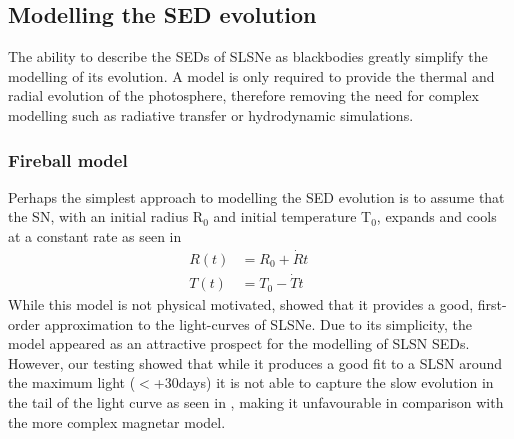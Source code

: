 \subsection{Modelling the SED evolution}
The ability to describe the SEDs of SLSNe as blackbodies greatly simplify the
modelling of its evolution. A model is only required to provide the thermal and radial evolution of the photosphere, therefore removing the need for complex modelling such as radiative transfer or hydrodynamic simulations.

\subsubsection{Fireball model}
Perhaps the simplest approach to modelling the SED evolution is to assume that the SN, with an initial radius R$_{0}$ and initial temperature T$_{0}$, expands and cools at a constant rate as seen in 
\begin{align}
\label{eq:Howell}
R(t) &= R_0 + \dot{R}t &&\\
T(t) &= T_0 - \dot{T}t &&
\end{align}
\noindent While this model is not physical motivated, \citet{Howell2013} showed that it provides a good, first-order approximation to the light-curves of SLSNe. Due to its simplicity, the model appeared as an attractive prospect for the modelling of SLSN SEDs. However, our testing showed that while it produces a good fit to a SLSN around the maximum light ($<$+30days) it is not able to capture the slow evolution in the tail of the light curve as seen in , making it unfavourable in comparison with the more complex magnetar model.

